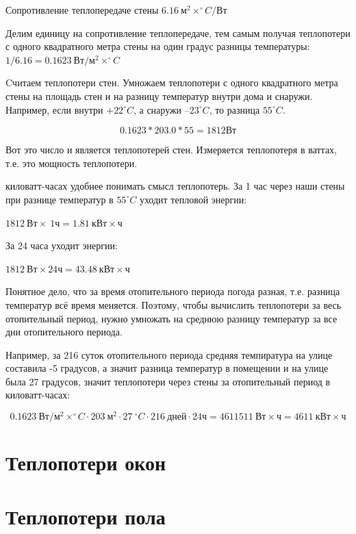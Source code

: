 \documentclass[10pt, twocolumn]{report}
\begin{document}
\noindent Сопротивление теплопередаче стены $6.16\ \text{м}^2\times ^{\circ}C / \text{Вт} $ 

\noindent Делим единицу на сопротивление теплопередаче, тем самым получая теплопотери с одного квадратного метра стены на один градус разницы температуры: 
$1 / 6.16 = 0.1623\ \text{Вт} / \text{м}^2\times ^{\circ}C$

\noindent Cчитаем теплопотери стен. Умножаем теплопотери с одного квадратного метра стены на площадь стен и на разницу температур внутри дома и снаружи. Например, если внутри $+22^{\circ}C$, а снаружи $–23^{\circ}C$, то разница $55^{\circ}C$.

$$ 0.1623 * 203.0 * 55 = 1812 \text{Вт} $$

Вот это число и является теплопотерей стен. Измеряется теплопотеря в ваттах, т.е. это мощность теплопотери.

 киловатт-часах удобнее понимать смысл теплопотерь. За 1 час через наши стены при разнице температур в $55^{\circ}C$ уходит тепловой энергии:

$1812\ \text{Вт} \times\ 1 \text{ч} = 1.81\ \text{кВт} \times \text{ч}$

За 24 часа уходит энергии:

$1812\ \text{Вт} \times 24 \text{ч} = 43.48\ \text{кВт} \times \text{ч} $

Понятное дело, что за время отопительного периода погода разная, т.е. разница температур всё время меняется. Поэтому, чтобы вычислить теплопотери за весь отопительный период, нужно умножать на среднюю разницу температур за все дни отопительного периода.

Например, за 216 суток отопительного периода средняя темпиратура на улице составила -5 градусов, а значит разница температур в помещении и на улице была 27 градусов, значит теплопотери через стены за отопительный период в киловатт-часах:

$$ 0.1623\ \text{Вт} / \text{м}^2\times^{\circ}C \cdot 203\ \text{м}^2 \cdot 27\ ^{\circ}C \cdot 216\ \text{дней} \cdot 24 \text{ч} = 4611511\ \text{Вт}\times\text{ч} = 4611\ \text{кВт}\times\text{ч} $$


\section{Теплопотери окон}

\section{Теплопотери пола}
\end{document}
